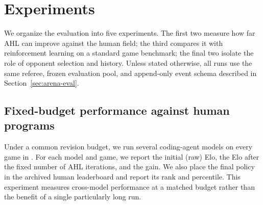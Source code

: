 \section{Experiments}
\label{sec:experiments}

We organize the evaluation into five experiments. The first two measure how far AHL
can improve against the human field; the third compares it with reinforcement learning
on a standard game benchmark; the final two isolate the role of opponent selection and
history. Unless stated otherwise, all runs use the same referee, frozen evaluation
pool, and append-only event schema described in Section~\ref{sec:arena-eval}.

\subsection{Fixed-budget performance against human programs}
\label{sec:exp-human}

Under a common revision budget, we run several coding-agent models on every game in
\benchname. For each model and game, we report the initial (raw) Elo, the Elo after
the fixed number of AHL iterations, and the gain. We also place the final policy in
the archived human leaderboard and report its rank and percentile. This experiment
measures cross-model performance at a matched budget rather than the benefit of a
single particularly long run.


